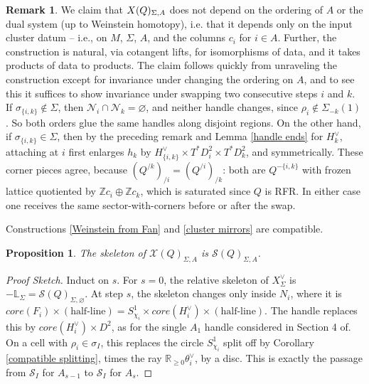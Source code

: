 \documentclass[11pt]{amsart}
\newtheorem{prop}[thm]{Proposition}
\theoremstyle{definition}
\newtheorem{rem}[thm]{Remark}
\theoremstyle{remark}
\newcommand{\X}{\mathcal{X}}
\renewcommand{\emptyset}{\varnothing}
\numberwithin{equation}{section}
\begin{document}
\begin{rem}\label{naturality}
    We claim that $\mathcal \X(Q)_{\Sigma,A}$ does not depend on the ordering of $A$ or the dual system (up to Weinstein homotopy), i.e. that it depends only on the input cluster datum -- i.e., on $M$, $\Sigma$, $A$, and the columns $c_i$ for $i\in A$. Further, the construction is natural, via cotangent lifts, for isomorphisms of data, and it takes products of data to products. The claim follows quickly from unraveling the construction except for invariance under changing the ordering on $A$, and to see this it suffices to show invariance under swapping two consecutive steps $i$ and $k.$\\

    If $\sigma_{\{i,k\}}\notin\Sigma$, then $\mathcal N_i\cap\mathcal N_k=\emptyset$, and neither handle changes, since $\rho_i\notin\Sigma_{-k}(1)$. So both orders glue the same handles along disjoint regions. On the other hand, if $\sigma_{\{i,k\}}\in\Sigma$, then by the preceding remark and Lemma \ref{handle ends} for $H_k^\vee$, attaching at $i$ first enlarges $h_k$ by $H^\vee_{\{i,k\}}\times T^*D^2_i\times T^*D^2_k$, and symmetrically. These corner pieces agree, because $(Q^{/k})_{/i}=(Q^{/i})_{/k}$: both are $Q^{-\{i,k\}}$ with frozen lattice quotiented by $\mathbb Zc_i\oplus\mathbb Zc_k$, which is saturated since $Q$ is RFR. In either case one receives the same sector-with-corners before or after the swap.
\end{rem}

Constructions \ref{Weinstein from Fan} and \ref{cluster mirrors} are compatible.

\begin{prop}\label{issa skeleton}
    The skeleton of $\mathcal{X}(Q)_{\Sigma, A}$ is $\mathcal{S}(Q)_{\Sigma, A}$.
\end{prop}

\begin{proof}[Proof Sketch]
    Induct on $s$. For $s=0$, the relative skeleton of $X^\vee_\Sigma$ is $-\mathbb{L}_\Sigma=\mathcal S(Q)_{\Sigma,\emptyset}$. At step $s$, the skeleton changes only inside $N_i$, where it is $core(F_i)\times(\text{half-line})=S^1_{\chi_i}\times core(H_i^\vee)\times(\text{half-line})$. The handle replaces this by $core(H_i^\vee)\times D^2$, as for the single $A_1$ handle considered in Section 4 of\cite{GL}. On a cell with $\rho_i\in\sigma_I$, this replaces the circle $S^1_{\chi_i}$ split off by Corollary \ref{compatible splitting}, times the ray $\mathbb R_{\ge0}\theta_i^\vee$, by a disc. This is exactly the passage from $\mathcal S_I$ for $A_{s-1}$ to $\mathcal S_I$ for $A_s$.
\end{proof}
\end{document}
